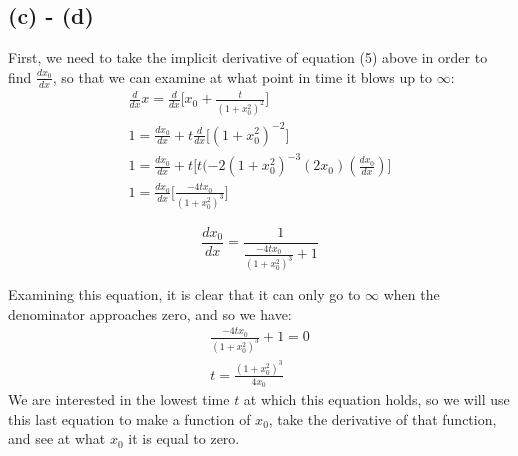 \documentclass{article}
\begin{document}
\subsection*{(c) - (d)}
First, we need to take the implicit derivative of equation (5) above in order to find $\frac{dx_0}{dx}$, so that we can examine at what point in time it blows up to $\infty$:
\begin{equation}
\begin{aligned}
\frac{d}{dx}x = \frac{d}{dx} \Big[x_0 + \frac{t}{(1+x_0^2)^2}\Big]\\
1 = \frac{dx_0}{dx} + t\frac{d}{dx}\Big[(1+x_0^2)^{-2}\Big]\\
1 = \frac{dx_0}{dx} + t\Big[t(-2(1 + x_0^2)^{-3}(2x_0)(\frac{dx_0}{dx})\Big]\\
1 = \frac{dx_0}{dx}\Big[\frac{-4tx_0}{(1+x_0^2)^3}\Big]
\end{aligned}
\end{equation}
\begin{tcolorbox}[minipage,colback=white,arc=0pt,outer arc=0pt]
\begin{equation}
\frac{dx_0}{dx} = \frac{1}{\frac{-4tx_0}{(1+x_0^2)^3} + 1}
\end{equation}
\end{tcolorbox}
Examining this equation, it is clear that it can only go to $\infty$ when the denominator approaches zero, and so we have:
\begin{equation}
\begin{aligned}
\frac{-4tx_0}{(1+x_0^2)^3} + 1 = 0\\
t = \frac{(1+x_0^2)^3}{4x_0}
\end{aligned}
\end{equation}
We are interested in the lowest time $t$ at which this equation holds, so we will use this last equation to make a function of $x_0$, take the derivative of that function, and see at what $x_0$ it is equal to zero.
\end{document}
